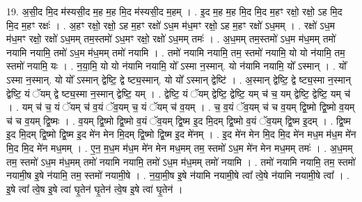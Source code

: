 \documentclass[17pt]{extarticle}
\begin{document}
19. अ॒सी॒द मि॒द म॑स्यसी॒द म॒ह म॒ह मि॒द म॑स्यसी॒द म॒हम् । . इ॒द म॒ह म॒ह मि॒द मि॒द म॒हꣳ रक्षो॒ रक्षो॒ ऽह मि॒द मि॒द म॒हꣳ रक्षः॑ । . अ॒हꣳ रक्षो॒ रक्षो॒ ऽह म॒हꣳ रक्षो॑ ऽध॒म म॑ध॒मꣳ रक्षो॒ ऽह म॒हꣳ रक्षो॑ ऽध॒मम् । . रक्षो॑ ऽध॒म म॑ध॒मꣳ रक्षो॒ रक्षो॑ ऽध॒मम् तम॒स्तमो॑ ऽध॒मꣳ रक्षो॒ रक्षो॑ ऽध॒मम् तमः॑ । . अ॒ध॒मम् तम॒स्तमो॑ ऽध॒म म॑ध॒मम् तमो॑ नयामि नयामि॒ तमो॑ ऽध॒म म॑ध॒मम् तमो॑ नयामि । . तमो॑ नयामि नयामि॒ तम॒ स्तमो॑ नयामि॒ यो यो न॑यामि॒ तम॒ स्तमो॑ नयामि॒ यः । . न॒या॒मि॒ यो यो न॑यामि नयामि॒ यो᳚ ऽस्मा न॒स्मान्. यो न॑यामि नयामि॒ यो᳚ ऽस्मान् । . यो᳚ ऽस्मा न॒स्मान्. यो यो᳚ ऽस्मान् द्वेष्टि॒ द्वे ष्ट्य॒स्मान्. यो यो᳚ ऽस्मान् द्वेष्टि॑ । . अ॒स्मान् द्वेष्टि॒ द्वे ष्ट्य॒स्मा न॒स्मान् द्वेष्टि॒ यं ॅयम् द्वे ष्ट्य॒स्मा न॒स्मान् द्वेष्टि॒ यम् । . द्वेष्टि॒ यं ॅयम् द्वेष्टि॒ द्वेष्टि॒ यम् च॑ च॒ यम् द्वेष्टि॒ द्वेष्टि॒ यम् च॑ । . यम् च॑ च॒ यं ॅयम् च॑ व॒यं ॅव॒यम् च॒ यं ॅयम् च॑ व॒यम् । . च॒ व॒यं ॅव॒यम् च॑ च व॒यम् द्वि॒ष्मो द्वि॒ष्मो व॒यम् च॑ च व॒यम् द्वि॒ष्मः । . व॒यम् द्वि॒ष्मो द्वि॒ष्मो व॒यं ॅव॒यम् द्वि॒ष्म इ॒द मि॒दम् द्वि॒ष्मो व॒यं ॅव॒यम् द्वि॒ष्म इ॒दम् । . द्वि॒ष्म इ॒द मि॒दम् द्वि॒ष्मो द्वि॒ष्म इ॒द मे॑न मेन मि॒दम् द्वि॒ष्मो द्वि॒ष्म इ॒द मे॑नम् । . इ॒द मे॑न मेन मि॒द मि॒द मे॑न मध॒म म॑ध॒म मे॑न मि॒द मि॒द मे॑न मध॒मम् । . ए॒न॒ म॒ध॒म म॑ध॒म मे॑न मेन मध॒मम् तम॒ स्तमो॑ ऽध॒म मे॑न मेन मध॒मम् तमः॑ । . अ॒ध॒मम् तम॒ स्तमो॑ ऽध॒म म॑ध॒मम् तमो॑ नयामि नयामि॒ तमो॑ ऽध॒म म॑ध॒मम् तमो॑ नयामि । . तमो॑ नयामि नयामि॒ तम॒ स्तमो॑ नयामी॒ष इ॒षे न॑यामि॒ तम॒ स्तमो॑ नयामी॒षे । . न॒या॒मी॒ष इ॒षे न॑यामि नयामी॒षे त्वा᳚ त्वे॒षे न॑यामि नयामी॒षे त्वा᳚ । . इ॒षे त्वा᳚ त्वे॒ष इ॒षे त्वा॑ घृ॒तेन॑ घृ॒तेन॑ त्वे॒ष इ॒षे त्वा॑ घृ॒तेन॑ । \newline
\end{document}
